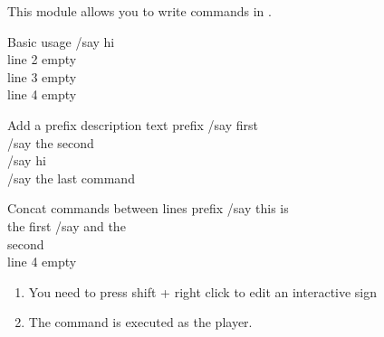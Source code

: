 This module allows you to write commands in .

\begin{example}{Basic usage}
    /say hi \\
    line 2 empty\\
    line 3 empty\\
    line 4 empty
\end{example}

\begin{example}{Add a prefix description text}
    prefix /say first\\
    /say the second\\
    /say hi \\
    /say the last command
\end{example}

\begin{example}{Concat commands between lines}
    prefix /say this is\\
    the first /say and the\\
    second\\
    line 4 empty
\end{example}

\begin{tips}{}
    \begin{enumerate}
        \item You need to press shift + right click to edit an interactive sign
        \item The command is executed as the player.
    \end{enumerate}
    
\end{tips}